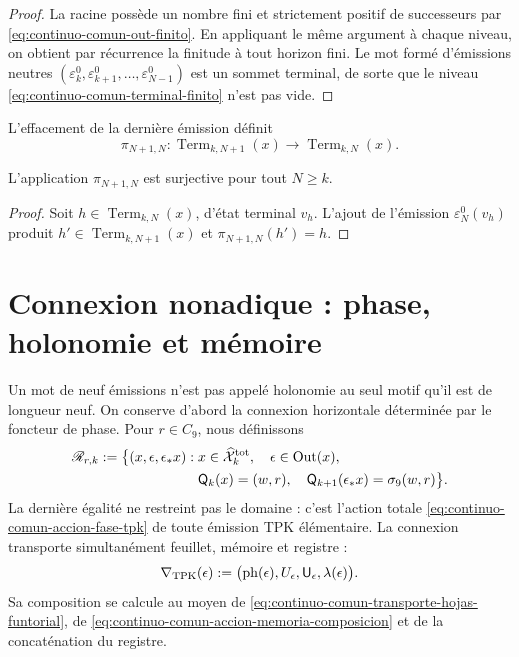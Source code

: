 \begin{proof}
La racine possède un nombre fini et strictement positif de successeurs par \eqref{eq:continuo-comun-out-finito}. En appliquant le même argument à chaque niveau, on obtient par récurrence la finitude à tout horizon fini. Le mot formé d'émissions neutres \((\varepsilon^0_k,\varepsilon^0_{k+1},\ldots,
\varepsilon^0_{N-1})\) est un sommet terminal, de sorte que le niveau \eqref{eq:continuo-comun-terminal-finito} n'est pas vide.
\end{proof}

L'effacement de la dernière émission définit
\begin{equation}
\label{eq:continuo-comun-proyeccion-terminal}
 \pi_{N+1,N}:\operatorname{Term}_{k,N+1}(x)
 \longrightarrow\operatorname{Term}_{k,N}(x).
\end{equation}

\begin{lemma}
\label{lem:continuo-comun-terminal-sobreyectivo}
L'application \(\pi_{N+1,N}\) est surjective pour tout \(N\geq k\).
\end{lemma}

\begin{proof}
Soit \(h\in\operatorname{Term}_{k,N}(x)\), d'état terminal \(v_h\). L'ajout de l'émission \(\varepsilon_N^0(v_h)\) produit \(h'\in\operatorname{Term}_{k,N+1}(x)\) et \(\pi_{N+1,N}(h')=h\).
\end{proof}

\section{Connexion nonadique : phase, holonomie et mémoire}
\label{sec:continuo-comun-gamma9-total}

Un mot de neuf émissions n'est pas appelé holonomie au seul motif qu'il est de longueur neuf. On conserve d'abord la connexion horizontale déterminée par le foncteur de phase. Pour \(r\in C_9\), nous définissons
\begin{equation}
\label{eq:continuo-comun-relacion-horizontal-fase}
 \begin{split}
 \mathscr R_{r,k}:=\bigl\{
 (x,\epsilon,\epsilon_*x):\;&
 x\in\widehat{\mathcal X}^{\rm tot}_k,\quad
 \epsilon\in\operatorname{Out}(x),\\
 &\mathsf Q_k(x)=(w,r),\quad
 \mathsf Q_{k+1}(\epsilon_*x)=\sigma_9(w,r)
 \bigr\}.
 \end{split}
\end{equation}
La dernière égalité ne restreint pas le domaine : c'est l'action totale \eqref{eq:continuo-comun-accion-fase-tpk} de toute émission TPK élémentaire. La connexion transporte simultanément feuillet, mémoire et registre :
\begin{equation}
\label{eq:continuo-comun-conexion-tpk-generador}
 \nabla_{\rm TPK}(\epsilon):=
 \bigl(\operatorname{ph}(\epsilon),U_\epsilon,
       \mathsf U_\epsilon,\lambda(\epsilon)\bigr).
\end{equation}
Sa composition se calcule au moyen de \eqref{eq:continuo-comun-transporte-hojas-funtorial}, de \eqref{eq:continuo-comun-accion-memoria-composicion} et de la concaténation du registre.

